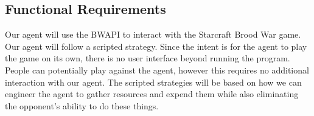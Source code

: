 \documentclass[10pt,letterpaper,onecolumn,draftclsnofoot]{IEEEtran}
\begin{document}
\subsection{Functional Requirements}
Our agent will use the BWAPI to interact with the Starcraft Brood War game. Our agent will follow a scripted strategy. Since the intent is for the agent to play the game on its own, there is no user interface beyond running the program. People can potentially play against the agent, however this requires no additional interaction with our agent. The scripted strategies will be based on how we can engineer the agent to gather resources and expend them while also eliminating the opponent's ability to do these things.
\end{document}

